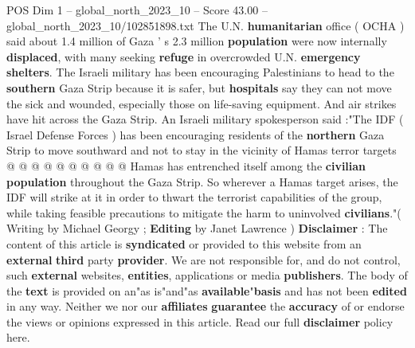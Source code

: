 \begin{textsample}{POS Dim 1 – global\_north\_2023\_10 – Score 43.00 – global\_north\_2023\_10/102851898.txt}
The U.N. \textbf{humanitarian} office ( OCHA ) said about 1.4 million of Gaza ' s 2.3 million \textbf{population} were now internally \textbf{displaced}, with many seeking \textbf{refuge} in overcrowded U.N. \textbf{emergency} \textbf{shelters}.
The Israeli military has been encouraging Palestinians to head to the \textbf{southern} Gaza Strip because it is safer, but \textbf{hospitals} say they can not move the sick and wounded, especially those on life-saving equipment.
And air strikes have hit across the Gaza Strip.
An Israeli military spokesperson said :"The IDF ( Israel Defense Forces ) has been encouraging residents of the \textbf{northern} Gaza Strip to move southward and not to stay in the vicinity of Hamas terror targets @ @ @ @ @ @ @ @ @ @ Hamas has entrenched itself among the \textbf{civilian} \textbf{population} throughout the Gaza Strip.
So wherever a Hamas target arises, the IDF will strike at it in order to thwart the terrorist capabilities of the group, while taking feasible precautions to mitigate the harm to uninvolved \textbf{civilians}."( Writing by Michael Georgy ; \textbf{Editing} by Janet Lawrence ) \textbf{Disclaimer} : The content of this article is \textbf{syndicated} or provided to this website from an \textbf{external} \textbf{third} party \textbf{provider}.
We are not responsible for, and do not control, such \textbf{external} websites, \textbf{entities}, applications or media \textbf{publishers}.
The body of the \textbf{text} is provided on an"as is"and"as \textbf{available}"\textbf{basis} and has not been \textbf{edited} in any way.
Neither we nor our \textbf{affiliates} \textbf{guarantee} the \textbf{accuracy} of or endorse the views or opinions expressed in this article.
Read our full \textbf{disclaimer} policy here.

\end{textsample}
